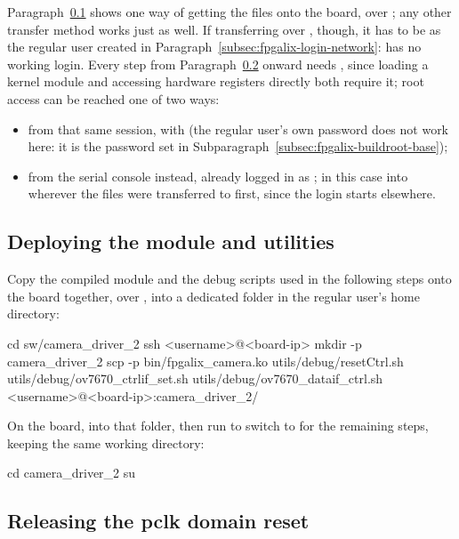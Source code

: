 Paragraph~\ref{subsec:fpgalix-camera-transfer} shows one way of getting the files onto the board, over ; any other transfer method works just as well. If transferring over , though, it has to be as the regular user created in Paragraph~\ref{subsec:fpgalix-login-network}:  has no working  login. Every step from Paragraph~\ref{subsec:fpgalix-camera-root} onward needs , since loading a kernel module and accessing hardware registers directly both require it; root access can be reached one of two ways:

\begin{itemize}
    \item from that same  session, with  (the regular user's own password does not work here: it is the  password set in Subparagraph~\ref{subsec:fpgalix-buildroot-base});
    \item from the serial console instead, already logged in as ; in this case  into wherever the files were transferred to first, since the  login starts elsewhere.
\end{itemize}

\subsection{Deploying the module and utilities}
\label{subsec:fpgalix-camera-transfer}

Copy the compiled module and the debug scripts used in the following steps onto the board together, over , into a dedicated  folder in the regular user's home directory:

\begin{shellcodehost}
cd sw/camera_driver_2
ssh <username>@<board-ip> mkdir -p camera_driver_2
scp -p bin/fpgalix_camera.ko utils/debug/resetCtrl.sh utils/debug/ov7670_ctrlif_set.sh utils/debug/ov7670_dataif_ctrl.sh <username>@<board-ip>:camera_driver_2/
\end{shellcodehost}

On the board,  into that folder, then run  to switch to  for the remaining steps, keeping the same working directory:

\begin{shellcodeboard}
cd camera_driver_2
su
\end{shellcodeboard}

\subsection{Releasing the pclk domain reset}
\label{subsec:fpgalix-camera-root}

